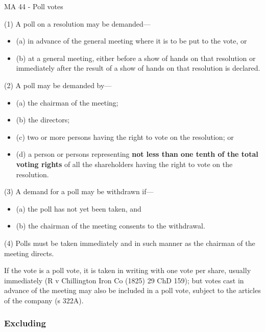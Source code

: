 \documentclass[
]{article}
\providecommand{\tightlist}{%
  \setlength{\itemsep}{0pt}\setlength{\parskip}{0pt}}
\newenvironment{env-12fb5320-b8eb-47b6-8035-097e16242c42}
{
    \savenotes\tcolorbox[blanker,breakable,left=5pt,borderline west={2pt}{-4pt}{green}]
}
{
    \endtcolorbox\spewnotes
}
\begin{document}
\begin{env-12fb5320-b8eb-47b6-8035-097e16242c42}

MA 44 - Poll votes

(1) A poll on a resolution may be demanded---

\begin{itemize}
\tightlist
\item
  (a) in advance of the general meeting where it is to be put to the
  vote, or
\item
  (b) at a general meeting, either before a show of hands on that
  resolution or immediately after the result of a show of hands on that
  resolution is declared.
\end{itemize}

(2) A poll may be demanded by---

\begin{itemize}
\tightlist
\item
  (a) the chairman of the meeting;
\item
  (b) the directors;
\item
  (c) two or more persons having the right to vote on the resolution; or
\item
  (d) a person or persons representing \textbf{not less than one tenth
  of the total voting rights} of all the shareholders having the right
  to vote on the resolution.
\end{itemize}

(3) A demand for a poll may be withdrawn if---

\begin{itemize}
\tightlist
\item
  (a) the poll has not yet been taken, and
\item
  (b) the chairman of the meeting consents to the withdrawal.
\end{itemize}

(4) Polls must be taken immediately and in such manner as the chairman
of the meeting directs.

\end{env-12fb5320-b8eb-47b6-8035-097e16242c42}

If the vote is a poll vote, it is taken in writing with one vote per
share, usually immediately (R v Chillington Iron Co (1825) 29 ChD 159);
but votes cast in advance of the meeting may also be included in a poll
vote, subject to the articles of the company (s 322A).

\hypertarget{excluding}{%
\subsubsection{Excluding}\label{excluding}}
\end{document}
